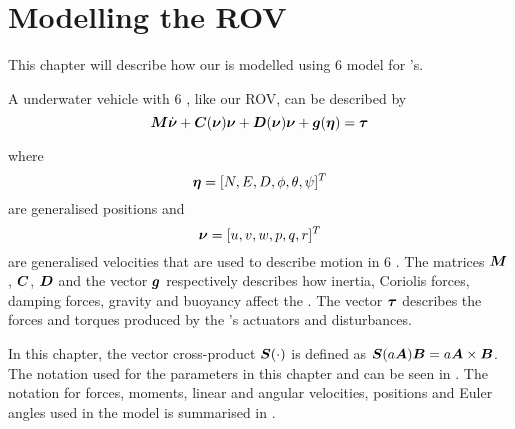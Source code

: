 \chapter{Modelling the ROV} \label{cha:modelling}
This chapter will describe how our \abbrROV is modelled using \citet{fossen2011} 6 \abbrDOF model for \abbrROV's.

A underwater vehicle with 6 \abbrDOF, like our ROV, can be described by
\begin{equation} \label{eq:model}
 \boldsymbol{M} \dot{\boldsymbol{\nu}} + \boldsymbol{C}(\boldsymbol{\nu})\boldsymbol{\nu} + \boldsymbol{D}(\boldsymbol{\nu})\boldsymbol{\nu} + \boldsymbol{g}(\boldsymbol{\eta}) = \boldsymbol{\tau}
\end{equation}
 
where
\begin{equation*}
  \boldsymbol{\eta} = [N, E, D, \phi, \theta, \psi]^T  
\end{equation*} are generalised positions and
\begin{equation*}
  \boldsymbol{\nu} = [u, v, w, p, q, r]^T 
\end{equation*}
are generalised velocities that are used to describe motion in 6 \abbrDOF. The matrices $\boldsymbol{M}$, $\boldsymbol{C}$, $\boldsymbol{D}$ and the vector $\boldsymbol{g}$ respectively describes how inertia, Coriolis forces, damping forces, gravity and buoyancy affect the \abbrROV. The vector $\boldsymbol{\tau}$ describes the forces and torques produced by the \abbrROV's actuators and disturbances.
 
In this chapter, the vector cross-product $\boldsymbol{S}(\cdot)$ is defined as $\boldsymbol{S}(a\boldsymbol{A}) \boldsymbol{B} = a\boldsymbol{A} \times \boldsymbol{B}$. The notation used for the parameters in this chapter and  can be seen in . The notation for forces, moments, linear and angular velocities, positions and Euler angles used in the model is summarised in . 

